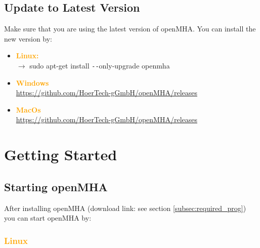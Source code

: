\documentclass[11pt,a4paper,twoside]{article}
\newcommand{\+}{\discretionary{\mbox{\scriptsize$\hookleftarrow$}}{}{}}
\begin{document}
\subsection{Update to Latest Version}


Make sure that you are using the latest version of openMHA. You can install the new version by:

\begin{itemize}
   \item \textcolor{orange}{\textbf{Linux:}} \\
   $\rightarrow$ {\ttfamily sudo apt-get install \texttt{-{}-}only-upgrade openmha} 
   \item \textcolor{orange}{\textbf{Windows}} \\
   \footnotesize{\url{https://github.com/HoerTech-gGmbH/openMHA/releases}}
   
   \item \textcolor{orange}{\textbf{\large{MacOs}}} \\
   \footnotesize{\url{https://github.com/HoerTech-gGmbH/openMHA/releases}}
   \end{itemize}



 




\section{Getting Started}

    \subsection{Starting openMHA}
    \label{starting_openmha}
    
After installing openMHA (download link: see section \ref{subsec:required_prog}) you can start openMHA by: 

\subsubsection*{\textcolor{orange}{\textbf{Linux}}}
\end{document}
